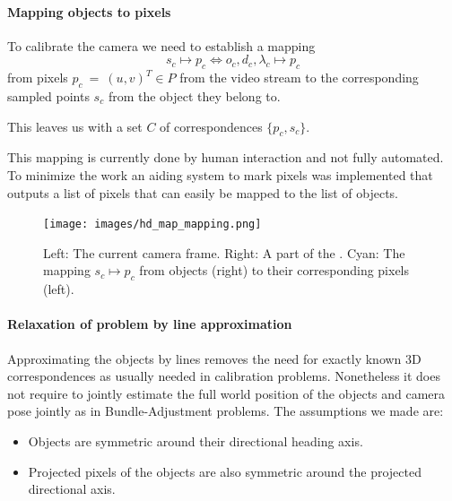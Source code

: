 \paragraph{Mapping objects to pixels}

To calibrate the camera we need to establish a mapping
\begin{equation}
  s_c \mapsto p_c \Leftrightarrow  {o_c, d_c, \lambda_c} \mapsto p_c
\end{equation}
from pixels $p_c~=~(u,v)^T \in P$ from the video stream to the corresponding sampled points $s_c$ from the object they belong to.

This leaves us with a set $C$ of correspondences $\{p_c,s_c\}$.

This mapping is currently done by human interaction and not fully automated. 
To minimize the work an aiding system to mark pixels was implemented that outputs a list of pixels that can easily be mapped to the list of objects.

\begin{figure}[t]
  \begin{center}
     \texttt{[image: images/hd\_map\_mapping.png]}
  \end{center}
     \caption{Left: The current camera frame. Right: A part of the \HDmaps{}. Cyan: The mapping $s_c \mapsto p_c$ from objects (right) to their corresponding pixels (left).}
  \label{fig:hd_map_mapping}
  \end{figure}


\paragraph{Relaxation of problem by line approximation}
\label{sec:static_calibration_line_approximation}

Approximating the objects by lines removes the need for exactly known 3D correspondences as usually needed in calibration problems. 
Nonetheless it does not require to jointly estimate the full world position of the objects and camera pose jointly as in Bundle-Adjustment problems.
%
The assumptions we made are: 
\begin{itemize}
  \item Objects are symmetric around their directional heading axis.
  \item Projected pixels of the objects are also symmetric around the projected directional axis.
\end{itemize}


